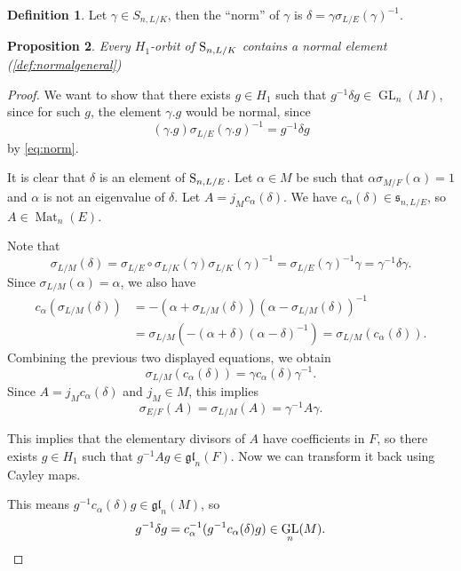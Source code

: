 \documentclass[11pt, reqno]{amsart}
\numberwithin{equation}{subsection}
\theoremstyle{plain}
\newtheorem{proposition}{Proposition}[subsection]
\theoremstyle{definition}
\newtheorem{definition}[proposition]{Definition}
\newcommand{\gl}{\mathfrak{gl}}
\newcommand{\fs}{\mathfrak s}
\renewcommand{\S}{\textnormal{S}}
\DeclareMathOperator{\GL}{GL}
\DeclareMathOperator{\Mat}{Mat}
\begin{document}
\begin{definition}
Let $\gamma \in S_{n,L/K}$, then the ``norm'' of $\gamma$ is 
$\delta = \gamma\sigma_{L/E}(\gamma)^{-1}$.
\end{definition}


\begin{proposition}
    \label{prop:normalrep}
Every $H_1$-orbit of
$\S_{n,L/K}$ contains a normal element (\ref{def:normalgeneral})
\end{proposition}
\begin{proof}
We want to show that there exists
$g \in H_1$ such that 
$g^{-1}\delta g \in \GL_n(M)$, since
for such $g$, the element $\gamma.g$ would be normal,
since
\[
    (\gamma.g)\sigma_{L/E}(\gamma.g)^{-1}
    = g^{-1}\delta g
\]
by \eqref{eq:norm}.

It is clear that $\delta$ is an element of $\S_{n, L/E}$.
Let $\alpha \in M$ be such that
$\alpha \sigma_{M/F}(\alpha) = 1$ and $\alpha$ is not
an eigenvalue of $\delta$. Let $A = j_M c_\alpha(\delta)$.
We have $c_\alpha(\delta) \in \fs_{n, L/E}$, so $A \in \Mat_n(E)$.

Note that 
\[
    \sigma_{L/M}(\delta) = 
    \sigma_{L/E}\circ \sigma_{L/K}(\gamma)\sigma_{L/K}(\gamma)^{-1}
    = \sigma_{L/E}(\gamma)^{-1} \gamma
    = \gamma^{-1} \delta \gamma.
\]
Since $\sigma_{L/M}(\alpha) = \alpha$, we also have
\begin{align*}
    c_\alpha(\sigma_{L/M}(\delta))
    &= - (\alpha + \sigma_{L/M}(\delta))(\alpha - \sigma_{L/M}(\delta))^{-1}\\
    &= \sigma_{L/M}(-(\alpha + \delta)(\alpha - \delta)^{-1}) = \sigma_{L/M}(c_\alpha(\delta)).
\end{align*}
Combining the previous two displayed equations, we obtain
\[
    \sigma_{L/M}(c_\alpha(\delta)) = \gamma c_\alpha(\delta) \gamma^{-1}.
\]
Since $A = j_M c_\alpha(\delta)$ and $j_M \in M$, 
this implies
\[
    \sigma_{E/F}(A) = \sigma_{L/M}(A) = \gamma^{-1} A \gamma.
\]

This implies that the elementary divisors of
$A$ have coefficients in $F$, so there exists $g \in H_1$ such
that $g^{-1} A g \in \gl_n(F)$. Now we can transform it back using Cayley maps.

This means $g^{-1} c_\alpha(\delta) g \in \gl_n(M)$, so 
\[
    g^{-1}\delta g = c_\alpha^{-1}(g^{-1} c_\alpha(\delta) g) \in \GL_n(M). \qedhere
\]
\end{proof}
\end{document}
